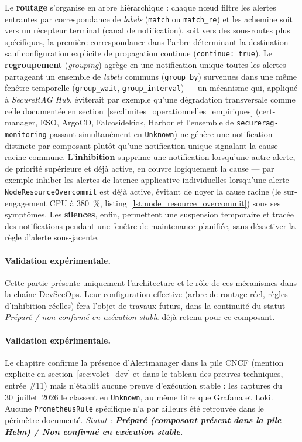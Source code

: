 Le \textbf{routage} s'organise en arbre hiérarchique : chaque nœud filtre les alertes entrantes par correspondance de \textit{labels} (\texttt{match} ou \texttt{match\_re}) et les achemine soit vers un récepteur terminal (canal de notification), soit vers des sous-routes plus spécifiques, la première correspondance dans l'arbre déterminant la destination sauf configuration explicite de propagation continue (\texttt{continue: true}). Le \textbf{regroupement} (\textit{grouping}) agrège en une notification unique toutes les alertes partageant un ensemble de \textit{labels} communs (\texttt{group\_by}) survenues dans une même fenêtre temporelle (\texttt{group\_wait}, \texttt{group\_interval}) — un mécanisme qui, appliqué à \textit{SecureRAG Hub}, éviterait par exemple qu'une dégradation transversale comme celle documentée en section~\ref{sec:limites_operationnelles_empiriques} (cert-manager, ESO, ArgoCD, Falcosidekick, Harbor et l'ensemble de \texttt{securerag-monitoring} passant simultanément en \texttt{Unknown}) ne génère une notification distincte par composant plutôt qu'une notification unique signalant la cause racine commune. L'\textbf{inhibition} supprime une notification lorsqu'une autre alerte, de priorité supérieure et déjà active, en couvre logiquement la cause — par exemple inhiber les alertes de latence applicative individuelles lorsqu'une alerte \texttt{NodeResourceOvercommit} est déjà active, évitant de noyer la cause racine (le sur-engagement CPU à 380~\%, listing~\ref{lst:node_resource_overcommit}) sous ses symptômes. Les \textbf{silences}, enfin, permettent une suspension temporaire et tracée des notifications pendant une fenêtre de maintenance planifiée, sans désactiver la règle d'alerte sous-jacente.

\paragraph{Validation expérimentale.} Cette partie présente uniquement l'architecture et le rôle de ces mécanismes dans la chaîne DevSecOps. Leur configuration effective (arbre de routage réel, règles d'inhibition réelles) fera l'objet de travaux futurs, dans la continuité du statut \textit{Préparé / non confirmé en exécution stable} déjà retenu pour ce composant.

\paragraph{Validation expérimentale.}
Le chapitre confirme la présence d'Alertmanager dans la pile CNCF (mention explicite en section~\ref{sec:volet_dev} et dans le tableau des preuves techniques, entrée \#11) mais n'établit aucune preuve d'exécution stable : les captures du 30~juillet~2026 le classent en \texttt{Unknown}, au même titre que Grafana et Loki. Aucune \texttt{PrometheusRule} spécifique n'a par ailleurs été retrouvée dans le périmètre documenté. \textit{Statut : \textbf{Préparé (composant présent dans la pile Helm) / Non confirmé en exécution stable}.}

